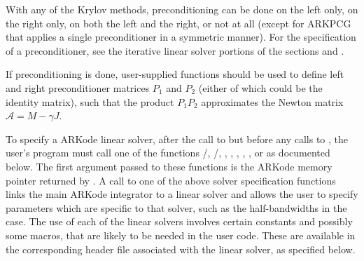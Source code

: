 \documentclass[letterpaper,10pt,english]{sphinxmanual}
\begin{document}
With any of the Krylov methods, preconditioning can be done on the
left only, on the right only, on both the left and the right, or not
at all (except for ARKPCG that applies a single preconditioner in a
symmetric manner). For the specification of a preconditioner, see the
iterative linear solver portions of the sections
{\hyperref[c_interface/User_callable:cinterface-optionalinputs]{\emph{}}} and {\hyperref[c_interface/User_supplied:cinterface-usersupplied]{\emph{}}}.

If preconditioning is done, user-supplied functions should be used to
define left and right preconditioner matrices \(P_1\) and
\(P_2\) (either of which could be the identity matrix), such that
the product \(P_{1}P_{2}\) approximates the Newton matrix
\({\mathcal A} = M - \gamma J\).

To specify a ARKode linear solver, after the call to
{\hyperref[c_interface/User_callable:c.ARKodeCreate]{\emph{}}} but before any calls to {\hyperref[c_interface/User_callable:c.ARKode]{\emph{}}},
the user's program must call one of the functions
{\hyperref[c_interface/User_callable:c.ARKDense]{\emph{}}}/{\hyperref[c_interface/User_callable:c.ARKLapackDense]{\emph{}}},
{\hyperref[c_interface/User_callable:c.ARKBand]{\emph{}}}/{\hyperref[c_interface/User_callable:c.ARKLapackBand]{\emph{}}},
{\hyperref[c_interface/User_callable:c.ARKKLU]{\emph{}}}, {\hyperref[c_interface/User_callable:c.ARKSuperLUMT]{\emph{}}},
{\hyperref[c_interface/User_callable:c.ARKSpgmr]{\emph{}}}, {\hyperref[c_interface/User_callable:c.ARKSpbcg]{\emph{}}}, {\hyperref[c_interface/User_callable:c.ARKSptfqmr]{\emph{}}},
{\hyperref[c_interface/User_callable:c.ARKSpfgmr]{\emph{}}} or {\hyperref[c_interface/User_callable:c.ARKPcg]{\emph{}}} as documented below. The
first argument passed to these functions is the ARKode memory pointer
returned by {\hyperref[c_interface/User_callable:c.ARKodeCreate]{\emph{}}}.  A call to one of the above
solver specification functions links the main ARKode integrator to a
linear solver and allows the user to specify parameters which are
specific to that solver, such as the half-bandwidths in the
{\hyperref[c_interface/User_callable:c.ARKBand]{\emph{}}} case.  The use of each of the linear solvers
involves certain constants and possibly some macros, that are likely
to be needed in the user code. These are available in the
corresponding header file associated with the linear solver, as
specified below.
\end{document}
